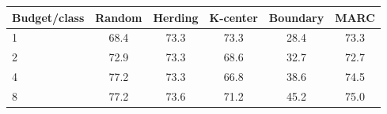 \begin{tabular}{lccccc}
\toprule
Budget/class & Random & Herding & K-center & Boundary & MARC \\
\midrule
1 & 68.4 & 73.3 & 73.3 & 28.4 & 73.3 \\
2 & 72.9 & 73.3 & 68.6 & 32.7 & 72.7 \\
4 & 77.2 & 73.3 & 66.8 & 38.6 & 74.5 \\
8 & 77.2 & 73.6 & 71.2 & 45.2 & 75.0 \\
\bottomrule
\end{tabular}
